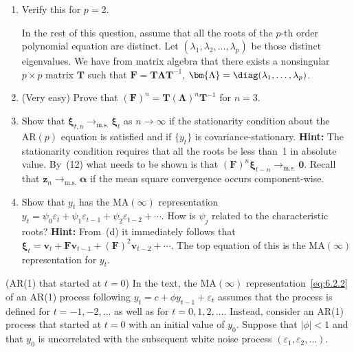 \begin{problemset}
\begin{enumerate}[label=(\alph*)]
\item Verify this for $p = 2$.

In the rest of this question, assume that all the roots of the $p$-th order polynomial
equation are distinct. Let $(\lambda_1, \lambda_2, \ldots, \lambda_p)$ be those distinct eigenvalues. We have from matrix algebra
that there exists a nonsingular $p \times p$ matrix $\mathbf{T}$ such that
$\mathbf{F} = \mathbf{T}\bm{\Lambda}\mathbf{T}^{-1}$, $\bm{\Lambda} = \diag(\lambda_1, \ldots, \lambda_p)$.

\item (Very easy) \; Prove that $(\mathbf{F})^n = \mathbf{T}(\bm{\Lambda})^n \mathbf{T}^{-1}$ for $n = 3$.

\item Show that $\bm{\xi}_{t,n} \to_{\mathrm{m.s.}} \bm{\xi}_t$ as $n \to \infty$ if the stationarity condition about the
$\text{AR}(p)$ equation is satisfied and if $\{y_t\}$ is covariance-stationary. \textbf{Hint:} The
stationarity condition requires that all the roots be less than~1 in absolute
value. By~(12) what needs to be shown is that $(\mathbf{F})^n \bm{\xi}_{t-n} \to_{\mathrm{m.s.}} \mathbf{0}$. Recall
that $\mathbf{z}_n \to_{\mathrm{m.s.}} \bm{\alpha}$ if the mean square convergence occurs component-wise.

\item Show that $y_t$ has the $\text{MA}(\infty)$ representation
$y_t = \psi_0 \varepsilon_t + \psi_1 \varepsilon_{t-1} + \psi_2 \varepsilon_{t-2} + \cdots$.
How is $\psi_j$ related to the characteristic roots? \textbf{Hint:} From~(d) it immediately
follows that $\bm{\xi}_t = \mathbf{v}_t + \mathbf{F}\mathbf{v}_{t-1} + (\mathbf{F})^2 \mathbf{v}_{t-2} + \cdots$.
The top equation of this is the $\text{MA}(\infty)$ representation for $y_t$.
\end{enumerate}

\exercise[8] (AR(1) that started at $t = 0$) \; In the text, the $\text{MA}(\infty)$ representation~\eqref{eq:6.2.2} of
an AR(1) process following $y_t = c + \phi y_{t-1} + \varepsilon_t$ assumes that the process is
defined for $t = -1, -2, \ldots$ as well as for $t = 0, 1, 2, \ldots$. Instead, consider
an AR(1) process that started at $t = 0$ with an initial value of $y_0$. Suppose that
$|\phi| < 1$ and that $y_0$ is uncorrelated with the subsequent white noise process
$(\varepsilon_1, \varepsilon_2, \ldots)$.


\end{problemset}
